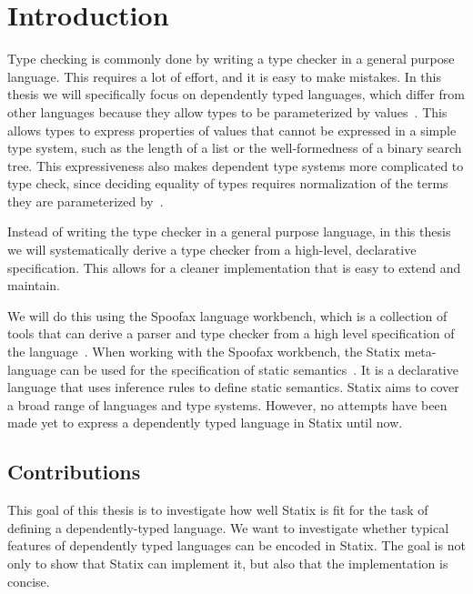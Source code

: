 \chapter{Introduction}

Type checking is commonly done by writing a type checker in a general purpose language. This requires a lot of effort, and it is easy to make mistakes. In this thesis we will specifically focus on dependently typed languages, which differ from other languages because they allow types to be parameterized by values~\cite{lambda_cube}. This allows types to express properties of values that cannot be expressed in a simple type system, such as the length of a list or the well-formedness of a binary search tree. This expressiveness also makes dependent type systems more complicated to type check, since deciding equality of types requires normalization of the terms they are parameterized by~\cite{Coquand_Huet_1988}. 

Instead of writing the type checker in a general purpose language, in this thesis we will systematically derive a type checker from a high-level, declarative specification. This allows for a cleaner implementation that is easy to extend and maintain.

We will do this using the Spoofax language workbench, which is a collection of tools that can derive a parser and type checker from a high level specification of the language~\cite{spoofax}. When working with the Spoofax workbench, the Statix meta-language can be used for the specification of static semantics~\cite{scopes_as_types}. It is a declarative language that uses inference rules to define static semantics. Statix aims to cover a broad range of languages and type systems. However, no attempts have been made yet to express a dependently typed language in Statix until now. 

\section*{Contributions}
This goal of this thesis is to investigate how well Statix is fit for the task of defining a dependently-typed language. We want to investigate whether typical features of dependently typed languages can be encoded in Statix. The goal is not only to show that Statix can implement it, but also that the implementation is concise.

